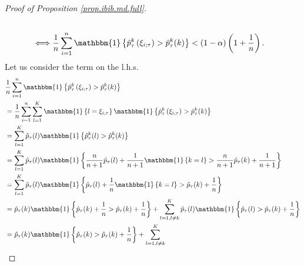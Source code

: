 \documentclass[11pt]{article}
\begin{document}
\begin{proof}[Proof of Proposition \ref{prop.ibib.md.full}]
\begin{align*}
        \\
        &
        \Longleftrightarrow 
        \frac{1}{n}
        \sum_{i = 1}^{n}
        \mathbbm{1} \brac{
            \hat{p}_{\tau}^{k}\paren{\xi_{i; \tau}}
            > \hat{p}^{k}_{\tau}(k)
        }
        < \paren{1 - \alpha} \paren{1 + \frac{1}{n}}.
    \end{align*}
    Let us consider the term on the l.h.s.
    \begin{align*}
        &
        \frac{1}{n}
        \sum_{i = 1}^{n}
        \mathbbm{1} \brac{
            \hat{p}_{\tau}^{k}\paren{\xi_{i; \tau}}
            > \hat{p}^{k}_{\tau}(k)
        }
        \\
        &
        =
        \frac{1}{n}
        \sum_{i = 1}^{n}
        \sum_{l = 1}^{K}
        \mathbbm{1} \brac{l = \xi_{i; \tau}}
        \mathbbm{1} \brac{
            \hat{p}_{\tau}^{k}\paren{\xi_{i; \tau}}
            > \hat{p}^{k}_{\tau}(k)
        }
        \\
        &
        =
        \sum_{l = 1}^{K}
        \hat{p}_{\tau}(l)
        \mathbbm{1} \brac{
            \hat{p}_{\tau}^{k}(l)
            > \hat{p}^{k}_{\tau}(k)
        }
        \\
        &
        =
        \sum_{l = 1}^{K}
        \hat{p}_{\tau}(l)
        \mathbbm{1} \brac{
            \frac{n}{n+1} \hat{p}_{\tau}(l)
            + \frac{1}{n+1} \mathbbm{1} \brac{k = l}
            >
            \frac{n}{n+1} \hat{p}_{\tau}(k)
            + \frac{1}{n+1}
        }
        \\
        &
        =
        \sum_{l = 1}^{K}
        \hat{p}_{\tau}(l)
        \mathbbm{1} \brac{
            \hat{p}_{\tau}(l)
            + \frac{1}{n} \mathbbm{1} \brac{k = l}
            >
            \hat{p}_{\tau}(k)
            + \frac{1}{n}
        }
        \\
        &
        =
        \hat{p}_{\tau}(k)
        \mathbbm{1} \brac{
            \hat{p}_{\tau}(k)
            + \frac{1}{n}
            >
            \hat{p}_{\tau}(k)
            + \frac{1}{n}
        }
        +
        \sum_{l = 1, l \neq k}^{K}
        \hat{p}_{\tau}(l)
        \mathbbm{1} \brac{
            \hat{p}_{\tau}(l)
            >
            \hat{p}_{\tau}(k)
            + \frac{1}{n}
        }
        \\
        &
        =
        \hat{p}_{\tau}(k)
        \mathbbm{1} \brac{
            \hat{p}_{\tau}(k)
            >
            \hat{p}_{\tau}(k)
            + \frac{1}{n}
        }
        +
        \sum_{l = 1, l \neq k}^{K}

\end{align*}
\end{proof}
\end{document}

